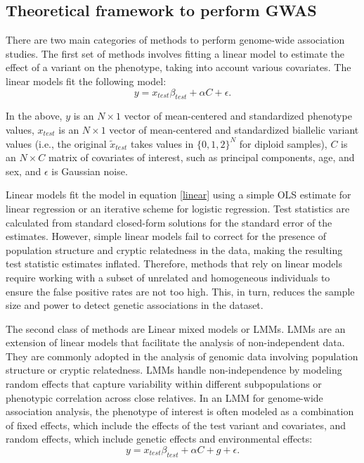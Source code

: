 \subsection{Theoretical framework to perform GWAS}
\label{sec:ch1-lmm}
There are two main categories of methods to perform genome-wide association studies. The first set of methods involves fitting a linear model to estimate the effect of a variant on the phenotype, taking into account various covariates. The linear models fit the following model:
\begin{equation}
    y = x_{test}\beta_{test} + \alpha C + \epsilon. \label{linear}
\end{equation}

In the above, \(y\) is an \(N \times 1\) vector of mean-centered and standardized phenotype values, \(x_{test}\) is an \(N \times 1\) vector of mean-centered and standardized biallelic variant values (i.e., the original \(\tilde{x}_{test}\) takes values in \(\{0,1,2\}^N\) for diploid samples), \(C\) is an \(N \times C\) matrix of covariates of interest, such as principal components, age, and sex, and \(\epsilon\) is Gaussian noise.

Linear models fit the model in equation \ref{linear} using a simple OLS estimate for linear regression or an iterative scheme for logistic regression. Test statistics are calculated from standard closed-form solutions for the standard error of the estimates. However, simple linear models fail to correct for the presence of population structure and cryptic relatedness in the data, making the resulting test statistic estimates inflated. Therefore, methods that rely on linear models require working with a subset of unrelated and homogeneous individuals to ensure the false positive rates are not too high. This, in turn, reduces the sample size and power to detect genetic associations in the dataset.

The second class of methods are Linear mixed models or LMMs. LMMs are an extension of linear models that facilitate the analysis of non-independent data. They are commonly adopted in the analysis of genomic data involving population structure or cryptic relatedness. LMMs handle non-independence by modeling random effects that capture variability within different subpopulations or phenotypic correlation across close relatives. In an LMM for genome-wide association analysis, the phenotype of interest is often modeled as a combination of fixed effects, which include the effects of the test variant and covariates, and random effects, which include genetic effects and environmental effects:
\begin{equation}
    y = x_{test}\beta_{test} + \alpha C + g + \epsilon \label{lmm}.
\end{equation}

